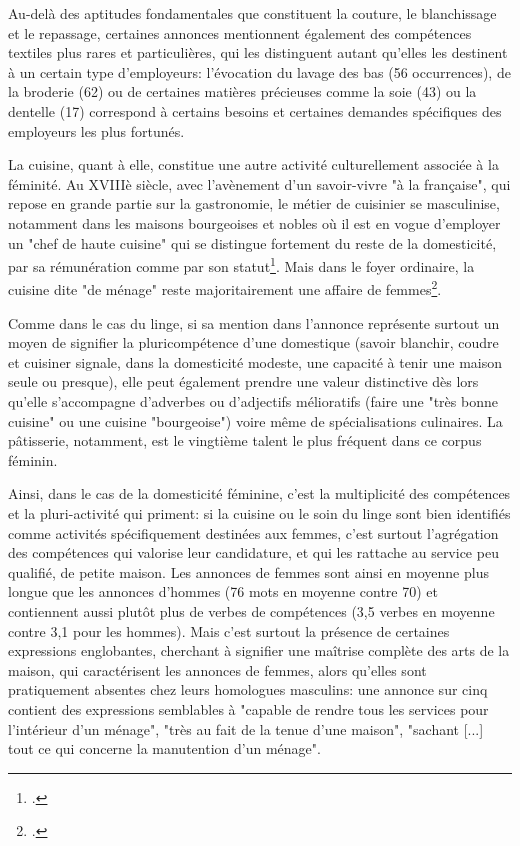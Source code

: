 Au-delà des aptitudes fondamentales que constituent la couture, le blanchissage et le repassage, certaines annonces mentionnent également des compétences textiles plus rares et particulières, qui les distinguent autant qu'elles les destinent à un certain type d'employeurs: l'évocation du lavage des bas (56 occurrences), de la broderie (62) ou de certaines matières précieuses comme la soie (43) ou la dentelle (17) correspond à certains besoins et certaines demandes spécifiques des employeurs les plus fortunés.


La cuisine, quant à elle, constitue une autre activité culturellement associée à la féminité. Au XVIIIè siècle, avec l'avènement d'un savoir-vivre "à la française", qui repose en grande partie sur la gastronomie, le métier de cuisinier se masculinise, notamment dans les maisons bourgeoises et nobles où il est en vogue d'employer un "chef de haute cuisine" qui se distingue fortement du reste de la domesticité, par sa rémunération comme par son statut\footcites[p.25-35]{sabattierFigaroSonMaitre1984}. Mais dans le foyer ordinaire, la cuisine dite "de ménage" reste majoritairement une affaire de femmes\footcites{drouardChapitrePremierCuisiniers2016}. 

Comme dans le cas du linge, si sa mention dans l'annonce représente surtout un moyen de signifier la pluricompétence d'une domestique (savoir blanchir, coudre et cuisiner signale, dans la domesticité modeste, une capacité à tenir une maison seule ou presque), elle peut également prendre une valeur distinctive dès lors qu'elle s'accompagne d'adverbes ou d'adjectifs mélioratifs (faire une "très bonne cuisine" ou une cuisine "bourgeoise") voire même de spécialisations culinaires. La pâtisserie, notamment, est le vingtième talent le plus fréquent dans ce corpus féminin. 

Ainsi, dans le cas de la domesticité féminine, c'est la multiplicité des compétences et la pluri-activité qui priment: si la cuisine ou le soin du linge sont bien identifiés comme activités spécifiquement destinées aux femmes, c'est surtout l'agrégation des compétences qui valorise leur candidature, et qui les rattache au service peu qualifié, de petite maison. Les annonces de femmes sont ainsi en moyenne plus longue que les annonces d'hommes (76 mots en moyenne contre 70) et contiennent aussi plutôt plus de verbes de compétences (3,5 verbes en moyenne contre 3,1 pour les hommes). Mais c'est surtout la présence de certaines expressions englobantes, cherchant à signifier une maîtrise complète des arts de la maison, qui caractérisent les annonces de femmes, alors qu'elles sont pratiquement absentes chez leurs homologues masculins: une annonce sur cinq contient des expressions semblables à "capable de rendre tous les services pour l'intérieur d'un ménage", "très au fait de la tenue d'une maison", "sachant [...] tout ce qui concerne la manutention d'un ménage".

